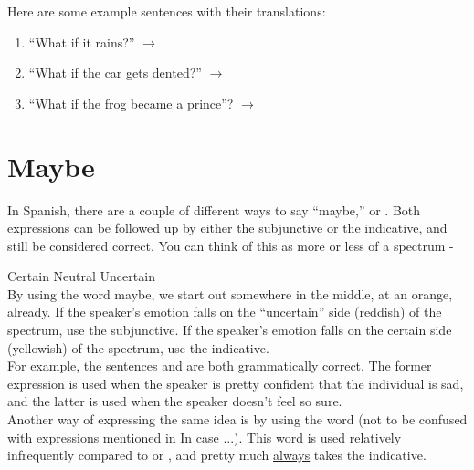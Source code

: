 Here are some example sentences with their translations:

\begin{enumerate}[noitemsep]
	\item ``What if it rains?'' $\rightarrow$ 
	\item ``What if the car gets dented?'' $\rightarrow$ 
	\item ``What if the frog became a prince''? $\rightarrow$ 
\end{enumerate}


\section{Maybe}

In Spanish, there are a couple of different ways to say ``maybe,''  or . Both expressions can be followed up by either the subjunctive or the indicative, and still be considered correct. You can think of this as more or less of a spectrum -


\begin{center}
\end{center}
Certain \hfill Neutral \hfill Uncertain\\ 
 
By using the word maybe, we start out somewhere in the middle, at an orange, already. If the speaker's emotion falls on the ``uncertain'' side (reddish) of the spectrum, use the subjunctive. If the speaker's emotion falls on the certain side (yellowish) of the spectrum, use the indicative. \\

For example, the sentences  and  are both grammatically correct. The former expression is used when the speaker is pretty confident that the individual is sad, and the latter is used when the speaker doesn't feel so sure. \\

Another way of expressing the same idea is by using the word  (not to be confused with expressions mentioned in \hyperref[sec:incase]{In case ...}). This word is used relatively infrequently compared to  or , and pretty much \underline{always} takes the indicative. 

